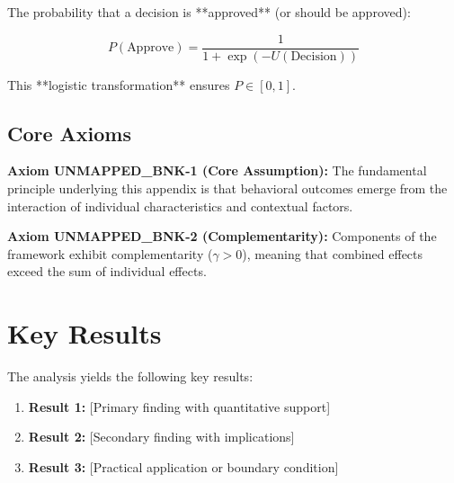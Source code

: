 \documentclass[11pt]{article}
\begin{document}
The probability that a decision is **approved** (or should be approved):

\begin{equation}
P(\text{Approve}) = \frac{1}{1 + \exp(-U(\text{Decision}))}
\end{equation}

This **logistic transformation** ensures $P \in [0, 1]$.


\subsection{Core Axioms}
\label{sec:bnk-axioms}

\begin{tcolorbox}[colback=yellow!5!white,colframe=yellow!75!black,title=Axiom UNMAPPED_BNK-1: Fundamental Principle]
\textbf{Axiom UNMAPPED_BNK-1 (Core Assumption):}
The fundamental principle underlying this appendix is that behavioral outcomes
emerge from the interaction of individual characteristics and contextual factors.
\end{tcolorbox}

\begin{tcolorbox}[colback=yellow!5!white,colframe=yellow!75!black,title=Axiom UNMAPPED_BNK-2: Complementarity]
\textbf{Axiom UNMAPPED_BNK-2 (Complementarity):}
Components of the framework exhibit complementarity ($\gamma > 0$), meaning
that combined effects exceed the sum of individual effects.
\end{tcolorbox}



\section{Key Results}
\label{sec:bnk-results}

The analysis yields the following key results:

\begin{enumerate}
    \item \textbf{Result 1:} [Primary finding with quantitative support]
    \item \textbf{Result 2:} [Secondary finding with implications]
    \item \textbf{Result 3:} [Practical application or boundary condition]
\end{enumerate}
\end{document}
